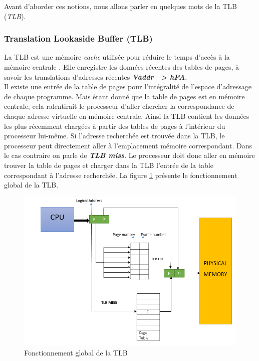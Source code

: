 \noindent Avant d'aborder ces notions, nous allons parler en quelques mots de la TLB (\textit{\acl{TLB}}). 

\subsubsection{Translation Lookaside Buffer (TLB)}
La TLB est une mémoire \textit{cache} utilisée pour réduire le temps d'accès à la mémoire centrale \cite{article7, book2}. Elle enregistre les données récentes des tables de pages, à savoir les translations d'adresses récentes \textit{\textbf{\acs{Vaddr} --> hPA}}.\\
Il existe une entrée de la table de pages pour l'intégralité de l'espace d'adressage de chaque programme. Mais étant donné que la table de pages est en mémoire centrale, cela ralentirait le processeur d'aller chercher la correspondance de chaque adresse virtuelle en mémoire centrale. Ainsi la TLB contient les données les plus récemment chargées à partir des tables de pages à l'intérieur du processeur lui-même. Si l'adresse recherchée est trouvée dans la TLB, le processeur peut directement aller à l'emplacement mémoire correspondant. Dans le cas contraire on parle de \textit{\textbf{TLB miss}}. Le processeur doit donc aller en mémoire trouver la table de pages et charger dans la TLB l'entrée de la table correspondant à l'adresse recherchée. La figure \ref{fig:tlb} présente le fonctionnement global de la TLB.
\begin{figure}[H]
    \centering
    \includegraphics[scale=.7]{chapters/1/fig1/tlb}
    \caption{Fonctionnement global de la TLB}
    \label{fig:tlb}
\end{figure}

